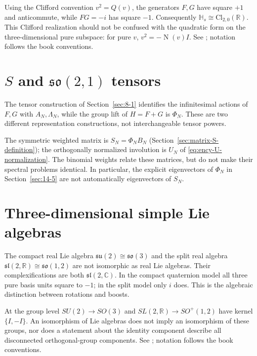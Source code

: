 Using the Clifford convention $v^2=Q(v)$, the generators $F,G$ have
square $+1$ and anticommute, while $FG=-i$ has square $-1$.
Consequently $\mathbb H_s\cong\mathrm{Cl}_{2,0}(\mathbb R)$.
This Clifford realization should not be confused with the quadratic
form on the three-dimensional pure subspace: for pure $v$,
$v^2=-\operatorname{N}(v)I$.
See \cite[Section~7]{KocikFeynman}; notation follows the book conventions.

\section{$S$ and $\mathfrak{so}(2,1)$ tensors}
\label{sec:6-4}
The tensor construction of Section~\ref{sec:8-1} identifies the
infinitesimal actions of $F,G$ with $A_N,\Lambda_N$, while the group
lift of $H=F+G$ is $\Phi_N$. These are two different representation
constructions, not interchangeable tensor powers.

The symmetric weighted matrix is $S_N=\Phi_NB_N$
(Section~\ref{sec:matrix-S-definition}); the orthogonally normalized
involution is $U_N$ of \eqref{eq:ency-U-normalization}. The binomial
weights relate these matrices, but do not make their spectral problems
identical. In particular, the explicit eigenvectors of $\Phi_N$ in
Section~\ref{sec:14-5} are not automatically eigenvectors of $S_N$.

\section{Three-dimensional simple Lie algebras}
\label{sec:6-5}
The compact real Lie algebra $\mathfrak{su}(2)\cong\mathfrak{so}(3)$
and the split real algebra
$\mathfrak{sl}(2,\mathbb R)\cong\mathfrak{so}(1,2)$ are not isomorphic
as real Lie algebras. Their complexifications are both
$\mathfrak{sl}(2,\mathbb C)$. In the compact quaternion model all three
pure basis units square to $-1$; in the split model only $i$ does.
This is the algebraic distinction between rotations and boosts.

At the group level $SU(2)\to SO(3)$ and
$SL(2,\mathbb R)\to SO^+(1,2)$ have kernel $\{I,-I\}$.
An isomorphism of Lie algebras does not imply an isomorphism of these
groups, nor does a statement about the identity component describe
all disconnected orthogonal-group components.
See \cite[Section~7]{KocikFeynman}; notation follows the book conventions.

